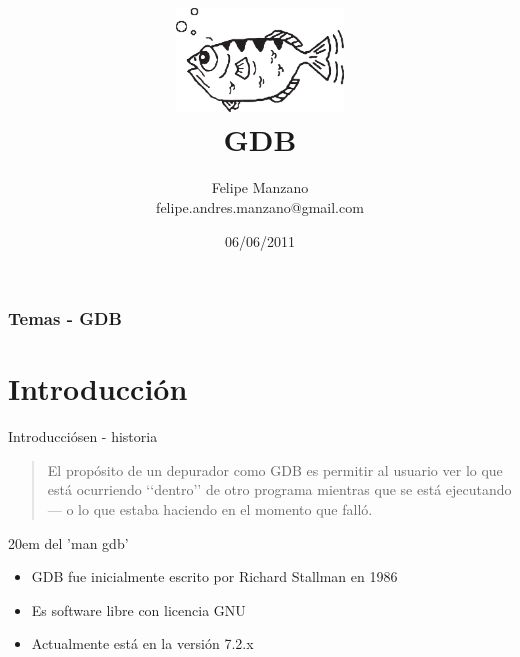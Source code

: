 \documentclass[xetex]{beamer}
\title{\includegraphics[width=6em]{archer.pdf}\\GDB}
\author{Felipe Manzano\\ felipe.andres.manzano@gmail.com}
\institute{Machinalis}
\date{06/06/2011}
\begin{document}
{
\begin{frame}{}\end{frame}
}

\begin{frame}
  \titlepage
\end{frame}


\begin{frame}
\frametitle{Temas - GDB}
\tableofcontents
\end{frame}

\section{Introducción}
\begin{frame}[fragile]{Introducciósen - historia}
\begin{quotation}
El propósito de un depurador como GDB es permitir al usuario ver lo que
está ocurriendo ‘‘dentro’’  de  otro  programa  mientras  que  se  está
ejecutando — o lo que estaba haciendo en el momento que falló.
\end{quotation}
{\hglue 20em del 'man gdb'}
\begin{itemize}
\item GDB fue inicialmente escrito por Richard Stallman en 1986 
\item Es software libre con licencia GNU
\item Actualmente está en la versión 7.2.x
\end{itemize}
\end{frame}
\end{document}
